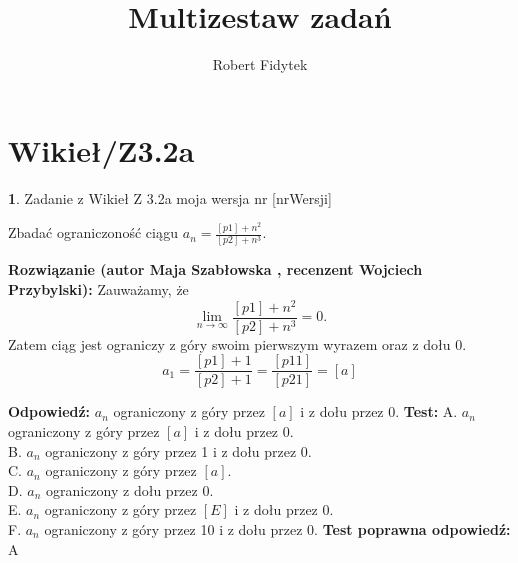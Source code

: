 \documentclass[12pt, a4paper]{article}
\title{Multizestaw zadań}
\author{Robert Fidytek}
\date{}
\theoremstyle{definition} %
\newtheorem{zad}{}
\newcommand{\kategoria}[1]{\section{#1}} %
\newcommand{\zadStart}[1]{\begin{zad}#1\newline} %
\newcommand{\zadStop}{\end{zad}}   %
\newcommand{\rozwStart}[2]{\noindent \textbf{Rozwiązanie (autor #1 , recenzent #2): }\newline} %
\newcommand{\rozwStop}{\newline}                                            %
\newcommand{\odpStart}{\noindent \textbf{Odpowiedź:}\newline}    %
\newcommand{\odpStop}{\newline}                                             %
\newcommand{\testStart}{\noindent \textbf{Test:}\newline} %
\newcommand{\testStop}{\newline} %
\newcommand{\kluczStart}{\noindent \textbf{Test poprawna odpowiedź:}\newline} %
\newcommand{\kluczStop}{\newline} %
\begin{document}
\maketitle


\kategoria{Wikieł/Z3.2a}
\zadStart{Zadanie z Wikieł Z 3.2a moja wersja nr [nrWersji]}

Zbadać ograniczoność ciągu $a_{n}=\frac{[p1]+n^{2}}{[p2]+n^{3}}$.
\zadStop

\rozwStart{Maja Szabłowska}{Wojciech Przybylski}
Zauważamy, że
$$\lim_{n\to\infty}\frac{[p1]+n^{2}}{[p2]+n^{3}}=0.$$
Zatem ciąg jest ograniczy z góry swoim pierwszym wyrazem oraz z dołu 0.
$$a_{1}=\frac{[p1]+1}{[p2]+1}=\frac{[p11]}{[p21]}=[a]$$
\rozwStop


\odpStart
$a_{n}$ ograniczony z góry przez $[a]$ i z dołu przez 0.
\odpStop
\testStart
A. $a_{n}$ ograniczony z góry przez $[a]$ i z dołu przez 0.\\
B. $a_{n}$ ograniczony z góry przez 1 i z dołu przez 0.\\
C. $a_{n}$ ograniczony z góry przez $[a]$.\\
D. $a_{n}$ ograniczony z dołu przez 0.\\
E. $a_{n}$ ograniczony z góry przez $[E]$ i z dołu przez 0.\\
F. $a_{n}$ ograniczony z góry przez 10 i z dołu przez 0.
\testStop
\kluczStart
A
\kluczStop
\end{document}
